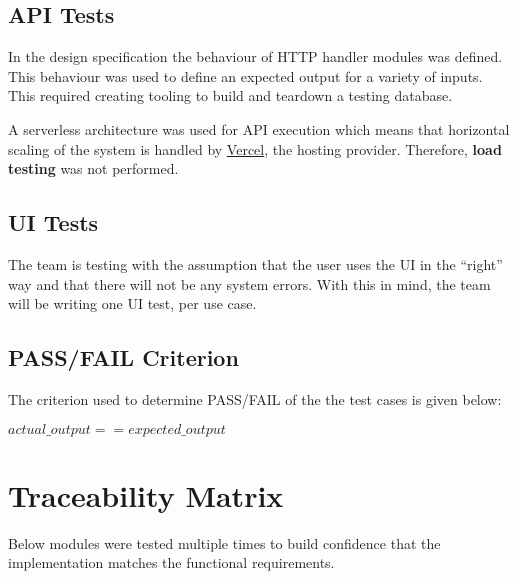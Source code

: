 \documentclass[fullpage]{article}
\begin{document}
\subsection{API Tests}
In the design specification the behaviour of HTTP handler modules was defined. This behaviour was used to define an expected output for a variety of inputs. This required creating tooling to build and teardown a testing database.

A serverless architecture was used for API execution which means that horizontal scaling of the system is handled by \href{https://vercel.com}{Vercel}, the hosting provider. Therefore, \textbf{load testing} was not performed.


\subsection{UI Tests}
The team is testing with the assumption that the user uses the UI in the ``right'' way and that there will not be any system errors. With this in mind, the team will be writing one UI test, per use case.


\subsection{PASS/FAIL Criterion}
The criterion used to determine PASS/FAIL of the the test cases is given below:
\begin{center}
    {$actual\_output == expected\_output$}
\end{center}

\newpage

\section{Traceability Matrix}
Below modules were tested multiple times to build confidence that the implementation matches the functional requirements.
\end{document}
